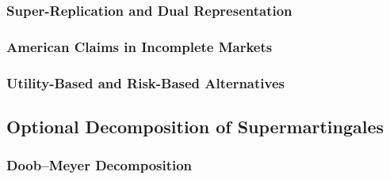 %


\subsubsection{Super-Replication and Dual Representation}

%


\subsubsection{American Claims in Incomplete Markets}

%


\subsubsection{Utility-Based and Risk-Based Alternatives}

%



\subsection{Optional Decomposition of Supermartingales}
\label{subsec:optional_decomposition}

\subsubsection{Doob--Meyer Decomposition}

%


